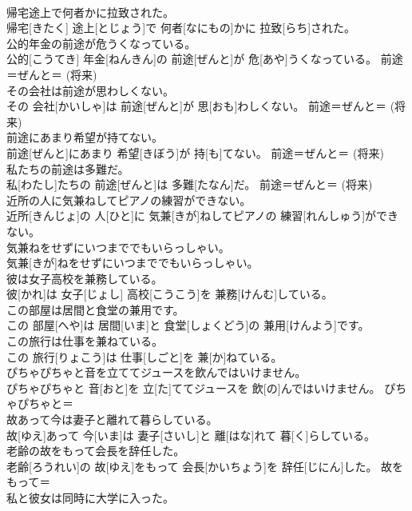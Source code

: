 \documentclass[8pt]{extreport}
\begin{document}
\begin{CJK}{UTF8}{min}
\\	帰宅途上で何者かに拉致された。	
\\	帰宅[きたく] 途上[とじょう]で 何者[なにもの]かに 拉致[らち]された。	
\\	公的年金の前途が危うくなっている。	
\\	公的[こうてき] 年金[ねんきん]の 前途[ぜんと]が 危[あや]うくなっている。	前途＝ぜんと＝ (将来) 
\\	その会社は前途が思わしくない。	
\\	その 会社[かいしゃ]は 前途[ぜんと]が 思[おも]わしくない。	前途＝ぜんと＝ (将来) 
\\	前途にあまり希望が持てない。	
\\	前途[ぜんと]にあまり 希望[きぼう]が 持[も]てない。	前途＝ぜんと＝ (将来) 
\\	私たちの前途は多難だ。	
\\	私[わたし]たちの 前途[ぜんと]は 多難[たなん]だ。	前途＝ぜんと＝ (将来) 
\\	近所の人に気兼ねしてピアノの練習ができない。	
\\	近所[きんじょ]の 人[ひと]に 気兼[きが]ねしてピアノの 練習[れんしゅう]ができない。	
\\	気兼ねをせずにいつまででもいらっしゃい。	
\\	気兼[きが]ねをせずにいつまででもいらっしゃい。	
\\	彼は女子高校を兼務している。	
\\	彼[かれ]は 女子[じょし] 高校[こうこう]を 兼務[けんむ]している。	
\\	この部屋は居間と食堂の兼用です。	
\\	この 部屋[へや]は 居間[いま]と 食堂[しょくどう]の 兼用[けんよう]です。	
\\	この旅行は仕事を兼ねている。	
\\	この 旅行[りょこう]は 仕事[しごと]を 兼[か]ねている。	
\\	ぴちゃぴちゃと音を立ててジュースを飲んではいけません。	
\\	ぴちゃぴちゃと 音[おと]を 立[た]ててジュースを 飲[の]んではいけません。	ぴちゃぴちゃと＝ 
\\	故あって今は妻子と離れて暮らしている。	
\\	故[ゆえ]あって 今[いま]は 妻子[さいし]と 離[はな]れて 暮[く]らしている。	
\\	老齢の故をもって会長を辞任した。	
\\	老齢[ろうれい]の 故[ゆえ]をもって 会長[かいちょう]を 辞任[じにん]した。	故をもって＝ 
\\	私と彼女は同時に大学に入った。	

\end{CJK}
\end{document}
